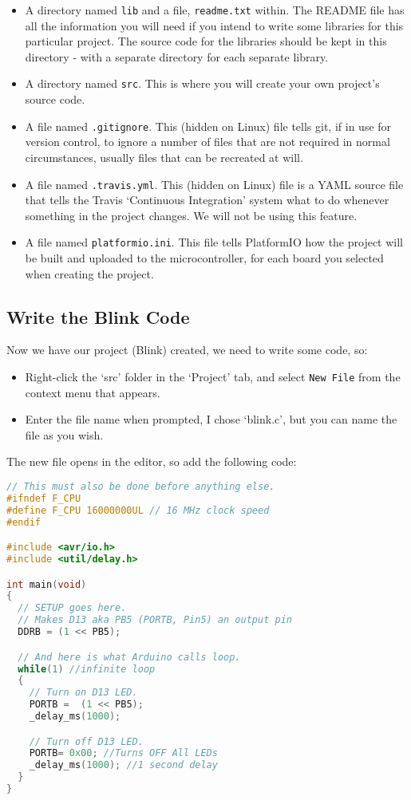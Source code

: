 \begin{itemize}
\item
  A directory named \lstinline!lib! and a file, \lstinline!readme.txt! within.
  The README file has all the information you will need if you intend to
  write some libraries for this particular project. The source code for
  the libraries should be kept in this directory - with a separate directory for each separate library.
\item
  A directory named \lstinline!src!. This is where you will create your own
  project's source code.
\item
  A file named \lstinline!.gitignore!. This (hidden on Linux) file tells git, if in use for
  version control, to ignore a number of files that are not required in
  normal circumstances, usually files that can be recreated at will.
\item
  A file named \lstinline!.travis.yml!. This (hidden on Linux) file is a YAML source file that
  tells the Travis `Continuous Integration' system what to do whenever
  something in the project changes. We will not be using this feature.
\item
  A file named \lstinline!platformio.ini!. This file tells PlatformIO how the
  project will be built and uploaded to the microcontroller, for each
  board you selected when creating the project.
\end{itemize}

\subsection{Write the Blink Code}\label{write-the-blink-code}

Now we have our project (Blink) created, we need to write some code, so:

\begin{itemize}
\item
  Right-click the `src' folder in the `Project' tab, and select
  \lstinline!New File! from the context menu that appears.
\item
  Enter the file name when prompted, I chose `blink.c', but you can name
  the file as you wish.
\end{itemize}

The new file opens in the editor, so add the following code:

\begin{lstlisting}[language=C,caption={AVRBlink.c}]
// This must also be done before anything else.
#ifndef F_CPU
#define F_CPU 16000000UL // 16 MHz clock speed
#endif

#include <avr/io.h>
#include <util/delay.h>

int main(void)
{
  // SETUP goes here.
  // Makes D13 aka PB5 (PORTB, Pin5) an output pin
  DDRB = (1 << PB5); 

  // And here is what Arduino calls loop.
  while(1) //infinite loop
  {
    // Turn on D13 LED.
    PORTB =  (1 << PB5);
    _delay_ms(1000);

    // Turn off D13 LED.
    PORTB= 0x00; //Turns OFF All LEDs
    _delay_ms(1000); //1 second delay
  }
}
\end{lstlisting}

